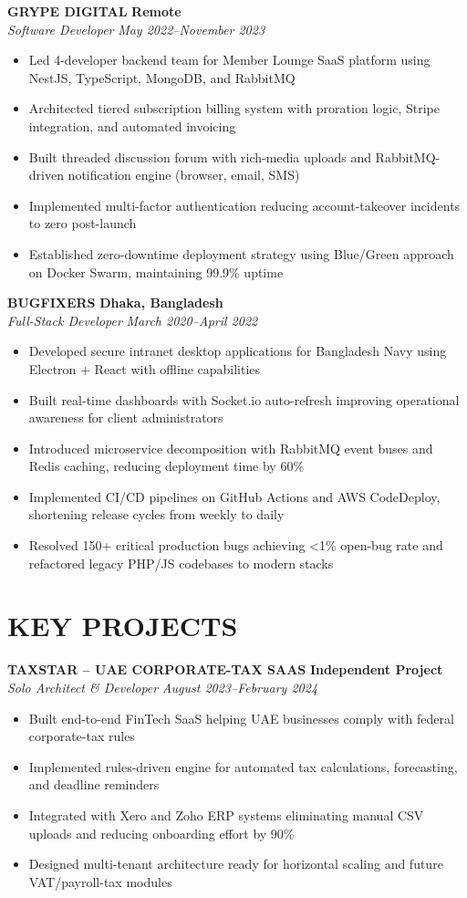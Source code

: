 \documentclass[11pt,letterpaper]{article}
\newcommand{\role}[4]{
  \begin{center}
  \textbf{#1} \hfill \textbf{#2} \\
  \textit{#3} \hfill \textit{#4}
  \end{center}
}
\begin{document}
\role{GRYPE DIGITAL}{Remote}{Software Developer}{May 2022--November 2023}
\begin{itemize}[leftmargin=*,nosep,topsep=0pt]
  \item Led 4-developer backend team for Member Lounge SaaS platform using NestJS, TypeScript, MongoDB, and RabbitMQ
  \item Architected tiered subscription billing system with proration logic, Stripe integration, and automated invoicing
  \item Built threaded discussion forum with rich-media uploads and RabbitMQ-driven notification engine (browser, email, SMS)
  \item Implemented multi-factor authentication reducing account-takeover incidents to zero post-launch
  \item Established zero-downtime deployment strategy using Blue/Green approach on Docker Swarm, maintaining 99.9\% uptime
\end{itemize}

\role{BUGFIXERS}{Dhaka, Bangladesh}{Full-Stack Developer}{March 2020--April 2022}
\begin{itemize}[leftmargin=*,nosep,topsep=0pt]
  \item Developed secure intranet desktop applications for Bangladesh Navy using Electron + React with offline capabilities
  \item Built real-time dashboards with Socket.io auto-refresh improving operational awareness for client administrators
  \item Introduced microservice decomposition with RabbitMQ event buses and Redis caching, reducing deployment time by 60\%
  \item Implemented CI/CD pipelines on GitHub Actions and AWS CodeDeploy, shortening release cycles from weekly to daily
  \item Resolved 150+ critical production bugs achieving <1\% open-bug rate and refactored legacy PHP/JS codebases to modern stacks
\end{itemize}

\vspace{1em}
\section{KEY PROJECTS}

\vspace{0.5em}
\role{TAXSTAR -- UAE CORPORATE-TAX SAAS}{Independent Project}{Solo Architect \& Developer}{August 2023--February 2024}
\begin{itemize}[leftmargin=*,nosep,topsep=0pt]
  \item Built end-to-end FinTech SaaS helping UAE businesses comply with federal corporate-tax rules
  \item Implemented rules-driven engine for automated tax calculations, forecasting, and deadline reminders
  \item Integrated with Xero and Zoho ERP systems eliminating manual CSV uploads and reducing onboarding effort by 90\%
  \item Designed multi-tenant architecture ready for horizontal scaling and future VAT/payroll-tax modules
\end{itemize}
\end{document}

